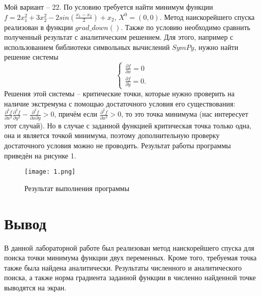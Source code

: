 \documentclass[a4paper, 14pt]{extarticle}
\begin{document}
Мой вариант -- 22. По условию требуется найти минимум функции $f = 2 x_1^2 + 3 x_2^2 - 2 sin(\frac{x_1 - x_2}{2}) + x_2$, $X^0 = (0, 0)$. 
Метод наискорейшего спуска реализован 
в функции $grad\_down()$. Также по условию необходимо сравнить полученный результат с аналитическим решением. Для этого, например с использованием библиотеки символьных 
вычислений $SymPy$, нужно найти решение системы 
\[
\begin{cases}
	\frac{\partial f}{\partial x} = 0 \\
	\frac{\partial f}{\partial y} = 0.
\end{cases}
\]
Решения этой системы -- критические точки, которые нужно проверить на наличие 
экстремума с помощью достаточного условия его существования: 
$\frac{\partial^2 f}{\partial x^2} \frac{\partial^2 f}{\partial y^2} - \frac{\partial^2 f}{\partial x \partial y} > 0$, причём если $\frac{\partial^2 f}{\partial x^2} > 0$, то это точка минимума (нас интересует этот случай). Но в случае 
с заданной функцией критическая точка только одна, она и является точкой минимума, 
поэтому дополнительную проверку достаточного условия можно не проводить.  
Результат работы программы приведён на рисунке 1.


\begin{figure}[H]
	
	\centering
	
	\texttt{[image: 1.png]}
	\captionsetup{justification=centering}
	\caption{Результат выполнения программы}
	
	\label{fig:mpr}
	
\end{figure}

\pagebreak

\section{Вывод}
В данной лабораторной работе был реализован метод наискорейшего спуска для 
поиска точки минимума функции двух переменных. Кроме того, требуемая точка также 
была найдена аналитически. Результаты численного и аналитического поиска, а также норма градиента заданной функции в численно найденной точке выводятся на экран. 
\end{document}
